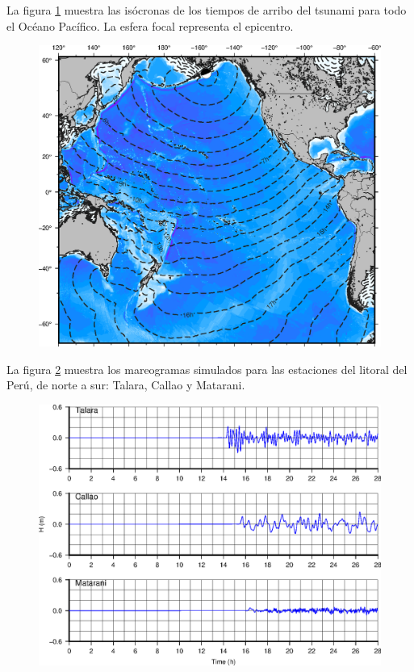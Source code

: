 \documentclass[a4paper,11pt,twocolumn]{article}
\begin{document}
La figura \ref{fig:ttt} muestra las isócronas de los tiempos de arribo del tsunami para todo el Océano Pacífico. La esfera focal representa el epicentro.

\begin{figure}[H]
  \centering
  \includegraphics[width=\linewidth]{ttt.eps}
  \label{fig:ttt}
\end{figure}

La figura \ref{fig:mareogramas} muestra los mareogramas simulados para las estaciones del litoral del Perú, de norte a sur: Talara, Callao y Matarani.

\begin{figure}[H]
  \centering
  \includegraphics[width=\linewidth]{mareograma.eps}
  \label{fig:mareogramas}
\end{figure}
\end{document}

